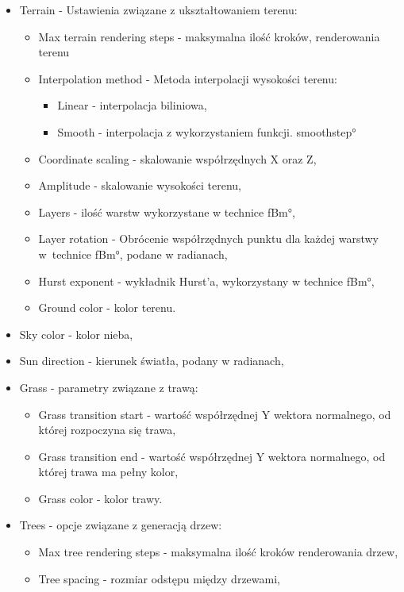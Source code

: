 \begin{itemize}
\item Terrain - Ustawienia związane z ukształtowaniem terenu:
  \begin{itemize}
    \item Max terrain rendering steps - maksymalna ilość kroków, renderowania terenu
    \item Interpolation method - Metoda interpolacji wysokości terenu:
      \begin{itemize}
        \item Linear - interpolacja biliniowa,
        \item Smooth - interpolacja z wykorzystaniem funkcji. \ang{smoothstep}
      \end{itemize}
    \item Coordinate scaling - skalowanie współrzędnych X oraz Z,
    \item Amplitude - skalowanie wysokości terenu,
    \item Layers - ilość warstw wykorzystane w technice \ang{fBm},
    \item Layer rotation - Obrócenie współrzędnych punktu dla każdej warstwy w~technice \ang{fBm}, podane w radianach,
    \item Hurst exponent - wykładnik Hurst'a, wykorzystany w technice \ang{fBm},
    \item Ground color - kolor terenu.
  \end{itemize}
\item Sky color - kolor nieba,
\item Sun direction - kierunek światła, podany w radianach,
\item Grass - parametry związane z trawą:
  \begin{itemize}
    \item Grass transition start - wartość współrzędnej Y wektora normalnego, od której rozpoczyna się trawa,
    \item Grass transition end - wartość współrzędnej Y wektora normalnego, od której trawa ma pełny kolor,
    \item Grass color - kolor trawy.
  \end{itemize}
\item Trees - opcje związane z generacją drzew:
  \begin{itemize}
    \item Max tree rendering steps - maksymalna ilość kroków renderowania drzew,
    \item Tree spacing - rozmiar odstępu między drzewami,

\end{itemize}
\end{itemize}
